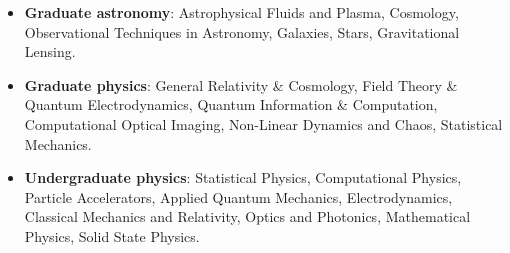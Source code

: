\begin{itemize}[leftmargin=0.15in, label={}, itemsep=0pt]
  \item \textbf{Graduate astronomy}: Astrophysical Fluids and Plasma, Cosmology, Observational Techniques in Astronomy, Galaxies, Stars, Gravitational Lensing.
  \item \textbf{Graduate physics}: General Relativity \& Cosmology, Field Theory \& Quantum Electrodynamics, Quantum Information \& Computation, Computational Optical Imaging, Non-Linear Dynamics and Chaos, Statistical Mechanics.
  \item \textbf{Undergraduate physics}: Statistical Physics, Computational Physics, Particle Accelerators, Applied Quantum Mechanics, Electrodynamics, Classical Mechanics and Relativity, Optics and Photonics, Mathematical Physics, Solid State Physics.
\end{itemize}
